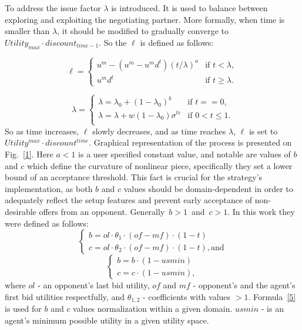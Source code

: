 \documentclass[html]{report}    %
\begin{document}
To address the issue factor $\lambda$ is introduced. It is used to balance between exploring and exploiting the negotiating partner. More formally, when time is smaller than $\lambda$, it should be modified to gradually converge to \( Utility_{max}\cdot discount_{time-1}  \). So the $\ell$ is defined as follows:

\begin{equation} \label{2}
	\ell =	\begin{cases}
	    	u^m -(u^m-	u^md^t)(t/\lambda)^a  & \mbox{if } t < \lambda, \\
	   		u^m d^t & \mbox{if } t \geq \lambda.
			\end{cases}
\end{equation}

\begin{equation} \label{3}
	\lambda =	\begin{cases}
	   		  	\lambda = \lambda_0 + (1-\lambda_0)^b &  \mbox{if } t==0,\\
	       		 \lambda = \lambda + w(1-\lambda_0)\sigma^{tc} & \mbox{if } 0<t\leq1.\\
				\end{cases}
\end{equation}
So as time increases, $\ell$ slowly decreases, and as time reaches $\lambda$, $\ell$ is set to \( Utility^{max}\cdot discount^{time}  \). Graphical representation of the process is presented on Fig.~\ref{1}. Here $a<1$ is a user specified constant value, and notable are values of $b$ and $c$ which define the curvature of nonlinear piece, specifically they set a lower bound of an acceptance threshold. This fact is crucial for the strategy's implementation, as both $b$ and $c$ values should be domain-dependent in order to adequately reflect the setup features and prevent early acceptance of non-desirable offers from an opponent. Generally~$b>1$~and~$c>1$. In this work they were defined as follows:
\begin{dmath} \label{4}	
	\begin{cases}
		b = ol \cdot \theta_1\cdot (of - mf) \cdot (1 - t) \\
		c = ol \cdot \theta_2\cdot (of - mf) \cdot (1 - t), \text{and}
	\end{cases}
\end{dmath}
\begin{dmath} \label{5}	
	\begin{cases}
		b = b\cdot(1 - usmin) \\
		c = c\cdot(1 - usmin),
	\end{cases}
\end{dmath}
where $ol$ - an opponent's last bid utility, $of$ and $mf$ - opponent's and the agent's first bid utilities respectfully, and $\theta_{1,2}$ - coefficients with values $>1$. Formula~\ref{5} is used for $b$ and $c$ values normalization within a given domain. $usmin$ - is an agent's minimum possible utility in a given utility space.
\end{document}
